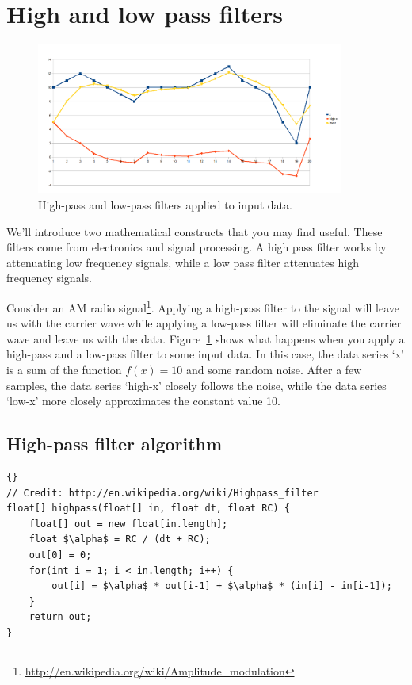 \documentclass[10pt]{article}
\begin{document}
\section{High and low pass filters}

\begin{figure}[ht]
\begin{center}
\includegraphics[width=0.9\textwidth]{Filters-example.png}
\end{center}
\caption{\label{fig:Filters}High-pass and low-pass filters applied to input data.}
\end{figure}

We'll introduce two mathematical constructs that you may find useful. These filters come from electronics and signal processing. A high pass filter works by attenuating low frequency signals, while a low pass filter attenuates high frequency signals. 

Consider an AM radio
signal\footnote{\url{http://en.wikipedia.org/wiki/Amplitude_modulation}}. Applying a high-pass
filter to the signal will leave us with the carrier wave while
applying a low-pass filter will eliminate the carrier wave and leave
us with the data.
Figure~\ref{fig:Filters} shows what happens when you apply a high-pass and a low-pass filter to some input data. In this case, the data series `x' is a sum of the function $f(x)=10$ and some random noise. After a few samples, the data series `high-x' closely follows the noise, while the data series `low-x' more closely approximates the constant value 10.

\newpage
\subsection{High-pass filter algorithm}
\begin{lstlisting}[frame=trbl]{}
// Credit: http://en.wikipedia.org/wiki/Highpass_filter
float[] highpass(float[] in, float dt, float RC) {
	float[] out = new float[in.length];
	float $\alpha$ = RC / (dt + RC);
	out[0] = 0;
	for(int i = 1; i < in.length; i++) {
		out[i] = $\alpha$ * out[i-1] + $\alpha$ * (in[i] - in[i-1]);
	}
	return out;
}
\end{lstlisting}
\end{document}
